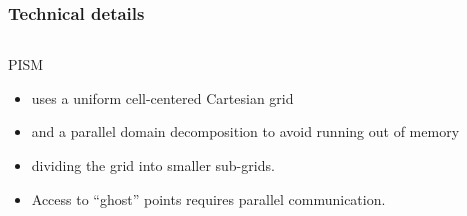 \documentclass[hide notes,intlimits]{beamer}
\begin{document}
\begin{frame}
  \frametitle{Technical details}

  \begin{columns}
    \begin{column}{0.5\linewidth}
      PISM
      \begin{itemize}
      \item<1-> uses a uniform cell-centered Cartesian grid
      \item<2-> and a parallel domain decomposition to avoid running out
        of memory
      \item<3-> dividing the grid into smaller sub-grids.
      \item<4> Access to ``ghost'' points requires parallel communication.
      \end{itemize}
    \end{column}


\end{columns}
\end{frame}
\end{document}
